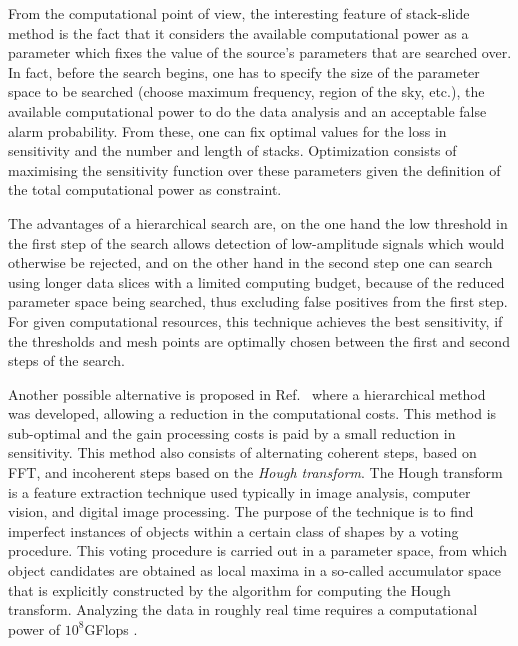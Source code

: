 From the computational point of view, the interesting feature of 
stack-slide method is the fact that it considers the available 
computational power as a parameter which fixes the value of the 
source's parameters that are searched over. In fact,  before the search 
begins, one has to specify the size of the parameter space to be 
searched (choose maximum frequency,  region of the sky, etc.), 
the available computational power to do the data analysis and an 
acceptable false alarm probability. From these, one can fix optimal 
values for the loss in sensitivity and the number and 
length  of stacks. Optimization consists of maximising the 
sensitivity function over these parameters given the definition 
of the total computational power as constraint.

The advantages of a hierarchical search are, on the one hand the 
low threshold in the first step of the search allows detection 
of low-amplitude signals which would otherwise be rejected, and 
on the other hand in the second step one can search using longer data 
slices with a limited computing budget, because of the reduced 
parameter space being searched, thus excluding false positives 
from the first step. For given computational resources, this 
technique achieves the best sensitivity, if the thresholds and 
mesh points are optimally chosen between the first and second 
steps of the search.

Another possible alternative is proposed in 
Ref.~\cite{Abbott:2005pu} where a hierarchical method was 
developed, allowing a reduction in the computational costs. 
This method is sub-optimal and the gain processing costs is paid 
by a small reduction in sensitivity. This method also consists 
of alternating coherent steps, based on FFT, and incoherent steps 
based on the {\em Hough transform}. The Hough transform  is a 
feature extraction technique used typically  in image analysis, 
computer vision, and digital image processing. The purpose of 
the technique is to find imperfect instances of objects 
within a certain class of shapes by a voting procedure. This 
voting procedure is carried out in a parameter space, 
from which object candidates are obtained as local maxima in a 
so-called accumulator space that is explicitly 
constructed by the algorithm for computing the Hough transform.
Analyzing the data in roughly real time requires a computational 
power of  $10^8$GFlops \cite{CQG:Hough}.



